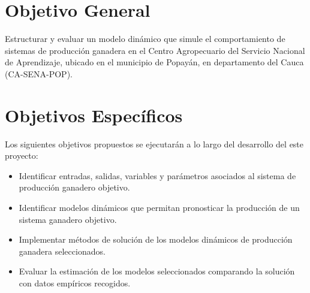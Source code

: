

\section{Objetivo General}
Estructurar y evaluar un modelo dinámico que simule el comportamiento de sistemas de producción ganadera en el Centro Agropecuario del Servicio Nacional de Aprendizaje, ubicado en el municipio de Popayán, en departamento del Cauca (CA-SENA-POP).

\section{Objetivos Específicos} %

Los siguientes objetivos propuestos se ejecutarán a lo largo del desarrollo del este proyecto:

\begin{itemize} %
    \item Identificar entradas, salidas, variables y parámetros asociados al sistema de producción ganadero objetivo.
    \item Identificar modelos dinámicos que permitan pronosticar la producción de un sistema ganadero objetivo.
    \item Implementar métodos de solución de los modelos dinámicos de producción ganadera seleccionados.
    \item Evaluar la estimación de los modelos seleccionados comparando la solución con datos empíricos recogidos.
\end{itemize}

